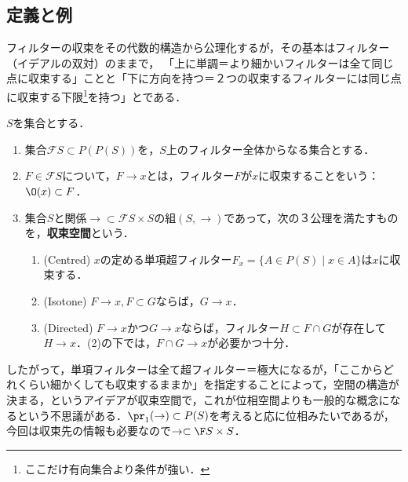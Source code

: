 \documentclass[uplatex,dvipdfmx]{jsreport}
\begin{document}
\subsection{定義と例}

\begin{tcolorbox}[colframe=ForestGreen, colback=ForestGreen!10!white,breakable,colbacktitle=ForestGreen!40!white,coltitle=black,fonttitle=\bfseries\sffamily,
title=]
    フィルターの収束をその代数的構造から公理化するが，その基本はフィルター（イデアルの双対）のままで，
    「上に単調＝より細かいフィルターは全て同じ点に収束する」ことと「下に方向を持つ＝２つの収束するフィルターには同じ点に収束する下限\footnote{ここだけ有向集合より条件が強い．}を持つ」とである．
\end{tcolorbox}

\begin{definition}
    $S$を集合とする．
    \begin{enumerate}
        \item 集合$\mathcal{F}S\subset P(P(S))$を，$S$上のフィルター全体からなる集合とする．
        \item $F\in\mathcal{F}S$について，$F\to x$とは，フィルター$F$が$x$に収束することをいう：$\O(x)\subset F$．
        \item 集合$S$と関係$\to\subset\mathcal{F}S\times S$の組$(S,\to)$であって，次の３公理を満たすものを，\textbf{収束空間}という．
        \begin{enumerate}[(1)]
            \item (Centred) $x$の定める単項超フィルター$F_x=\{A\in P(S)\mid x\in A\}$は$x$に収束する．
            \item (Isotone) $F\to x,F\subset G$ならば，$G\to x$．
            \item (Directed) $F\to x$かつ$G\to x$ならば，フィルター$H\subset  F\cap G$が存在して$H\to x$．(2)の下では，$F\cap G\to x$が必要かつ十分．
        \end{enumerate}
    \end{enumerate}
\end{definition}
\begin{remarks}
    したがって，単項フィルターは全て超フィルター＝極大になるが，「ここからどれくらい細かくしても収束するままか」を指定することによって，空間の構造が決まる，というアイデアが収束空間で，これが位相空間よりも一般的な概念になるという不思議がある．$\pr_1(\to)\subset P(S)$を考えると応に位相みたいであるが，今回は収束先の情報も必要なので$\to\subset\F S\times S$．
\end{remarks}
\end{document}
